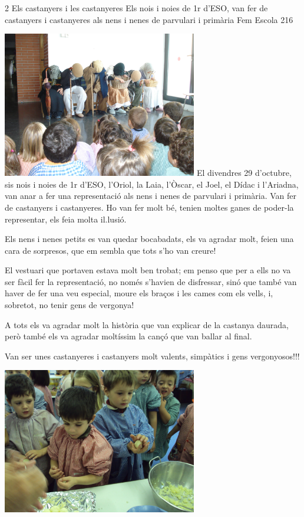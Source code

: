 
\begin{news}
{2} %
{Els castanyers i les castanyeres}
{Els nois i noies de 1r d’ESO,  van fer de castanyers i castanyeres als nens i nenes de parvulari i primària}
{Fem Escola}
{216} %


\noindent\includegraphics[width=8.5cm,keepaspectratio]{parvulari/img/castanyada_fiotos012.jpg}
El divendres  29 d’octubre,  sis nois i noies de 1r d’ESO,  l’Oriol, la Laia, l’Òscar, el Joel, el Dídac i l’Ariadna,  van anar a fer una representació als nens i nenes de parvulari i primària. Van fer de castanyers i castanyeres. Ho van fer molt bé, tenien moltes ganes de poder-la representar, els feia molta il.lusió.

Els nens i nenes petits es van quedar bocabadats, els va agradar molt, feien una cara de sorpresos, que em sembla que tots s’ho van creure!

El vestuari que portaven estava molt ben trobat; em penso que per a ells no va ser fàcil fer la representació, no només s’havien de disfressar, sinó que també van haver de fer una veu especial, moure els braços i les cames com els vells, i, sobretot, no tenir gens de vergonya! 

A tots els va agradar molt la història que van explicar de la castanya daurada, però també els va agradar moltíssim la cançó que van ballar al final.

Van ser unes castanyeres i castanyers molt valents, simpàtics i gens vergonyosos!!!

\noindent\includegraphics[width=8.5cm,keepaspectratio]{parvulari/img/castanyada_DSC00666.JPG}


\end{news}
